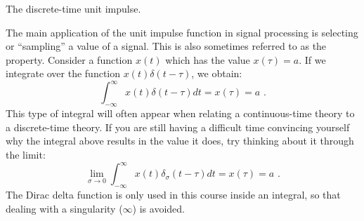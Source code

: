 \begin{marginfigure}
\begin{center}
\end{center}
\caption{The discrete-time unit impulse.}
\label{fig:udensdisc}
\end{marginfigure}

The main application of the unit impulse function in signal processing is selecting or ``sampling'' a value of a signal. This is also sometimes referred to as the \emph{} property. 
Consider a function $x(t)$ which has the value $x(\tau) = a$. If we integrate over the function $x(t)\delta(t-\tau)$, we obtain:
\begin{equation}
\int_{-\infty}^{\infty}x(t)\delta(t-\tau) dt = x(\tau) = a\,\,.
\end{equation}
This type of integral will often appear when relating a continuous-time theory to a discrete-time theory. 
If you are still having a difficult time convincing yourself why the integral above results in the value it does, try thinking about it through the limit:
\begin{equation}
\lim_{\sigma\rightarrow 0}\int_{-\infty}^{\infty}x(t)\delta_{\sigma}(t-\tau) dt = x(\tau) = a\,\,.
\end{equation}
The Dirac delta function is only used in this course inside an integral, so that dealing with a singularity ($\infty$) is avoided.

